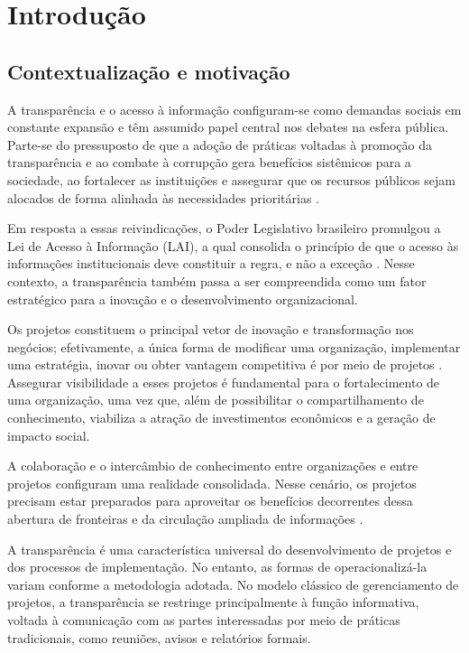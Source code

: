 \chapter{Introdução}

\section{Contextualização e motivação}

A transparência e o acesso à informação configuram-se como demandas sociais em constante expansão e têm assumido papel central nos debates na esfera pública. Parte-se do pressuposto de que a adoção de práticas voltadas à promoção da transparência e ao combate à corrupção gera benefícios sistêmicos para a sociedade, ao fortalecer as instituições e assegurar que os recursos públicos sejam alocados de forma alinhada às necessidades prioritárias \cite{figueiredo2016papel}. 

Em resposta a essas reivindicações, o Poder Legislativo brasileiro promulgou a Lei de Acesso à Informação (LAI), a qual consolida o princípio de que o acesso às informações institucionais deve constituir a regra, e não a exceção \cite{L12527}. Nesse contexto, a transparência também passa a ser compreendida como um fator estratégico para a inovação e o desenvolvimento organizacional.

Os projetos constituem o principal vetor de inovação e transformação nos negócios; efetivamente, a única forma de modificar uma organização, implementar uma estratégia, inovar ou obter vantagem competitiva é por meio de projetos \cite{van20147}. Assegurar visibilidade a esses projetos é fundamental para o fortalecimento de uma organização, uma vez que, além de possibilitar o compartilhamento de conhecimento, viabiliza a atração de investimentos econômicos e a geração de impacto social.

A colaboração e o intercâmbio de conhecimento entre organizações \cite{nooshinfard2014success} e entre projetos \cite{wiewiora2014interactions} configuram uma realidade consolidada. Nesse cenário, os projetos precisam estar preparados para aproveitar os benefícios decorrentes dessa abertura de fronteiras e da circulação ampliada de informações \cite{vieira2020universal}.

A transparência é uma característica universal do desenvolvimento de projetos e dos processos de implementação. No entanto, as formas de operacionalizá-la variam conforme a metodologia adotada. No modelo clássico de gerenciamento de projetos, a transparência se restringe principalmente à função informativa, voltada à comunicação com as partes interessadas por meio de práticas tradicionais, como reuniões, avisos e relatórios formais.

